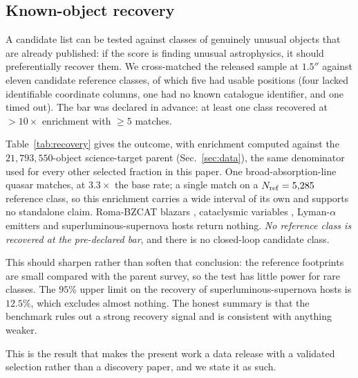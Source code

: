 \documentclass[aps,prd,twocolumn,superscriptaddress,nofootinbib,longbibliography,floatfix]{revtex4-2}
\newcommand{\TARGETID}{\texttt{TARGETID}}
\begin{document}
\subsection{Known-object recovery}
\label{sec:recovery}
A candidate list can be tested against classes of genuinely unusual objects
that are already published: if the score is finding unusual astrophysics, it
should preferentially recover them. We cross-matched the released sample at
$1.5''$ against eleven candidate reference classes, of which five had usable
positions (four lacked identifiable coordinate columns, one had no known
catalogue identifier, and one timed out).
The bar was declared in advance: at least one class recovered at
$>10\times$ enrichment with $\ge 5$ matches.

Table~\ref{tab:recovery} gives the outcome, with enrichment computed against
the $21{,}793{,}550$-object science-target parent (Sec.~\ref{sec:data}), the
same denominator used for every other selected fraction in this paper. One
broad-absorption-line quasar \cite{Gibson2009} matches, at $3.3\times$ the
base rate; a single match on a $N_{\rm ref}=5{,}285$ reference class, so this
enrichment carries a wide interval of its own and supports no standalone
claim. Roma-BZCAT blazars \cite{Massaro2015}, cataclysmic variables
\cite{RitterKolb2003}, Lyman-$\alpha$ emitters \cite{Ouchi2008} and
superluminous-supernova hosts \cite{Perley2016} return nothing.
\emph{No reference class is recovered at the pre-declared bar}, and there is
no closed-loop candidate class.

This should sharpen rather than soften that conclusion: the reference
footprints are small compared with the parent survey, so the test has little
power for rare classes. The $95\%$ upper limit on the
recovery of superluminous-supernova hosts is $12.5\%$, which excludes almost
nothing. The honest summary is that the benchmark rules out a strong
recovery signal and is consistent with anything weaker.

This is the result that makes the present work a data release with a
validated selection rather than a discovery paper, and we state it as such.

\begin{table}[t]
\caption{Known-object recovery benchmark, $1.5''$ positional match.
$N_{\rm ref}$ counts reference objects inside the DR1 footprint; recovery is
the matched fraction of those, with a $95\%$ Wilson interval; enrichment is
recovery over the catalogue's base rate against the $21{,}793{,}550$
science-target parent (Sec.~\ref{sec:data}), not the $27{,}547{,}223$
all-\TARGETID\ parent.}
\label{tab:recovery}

\end{table}
\end{document}
